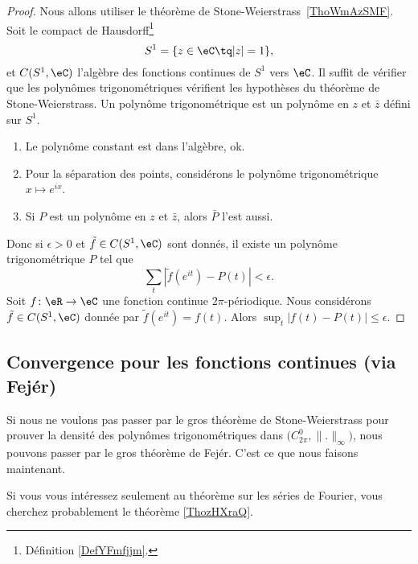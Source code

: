 \begin{proof}
	Nous allons utiliser le théorème de Stone-Weierstrass~\ref{ThoWmAzSMF}. Soit le compact de Hausdorff\footnote{Définition \ref{DefYFmfjjm}.}
	\begin{equation}
		S^1=\{ z\in \eC\tq | z |=1 \},
	\end{equation}
	et \( C(S^1,\eC)\) l'algèbre des fonctions continues de \( S^1\) vers \( \eC\). Il suffit de vérifier que les polynômes trigonométriques vérifient les hypothèses du théorème de Stone-Weierstrass. Un polynôme trigonométrique est un polynôme en \( z\) et \( \bar z\) défini sur \( S^1\).
	\begin{enumerate}
		\item
		      Le polynôme constant est dans l'algèbre, ok.
		\item
		      Pour la séparation des points, considérons le polynôme trigonométrique \( x\mapsto  e^{ix}\).
		\item
		      Si \( P\) est un polynôme en \( z\) et \( \bar z\), alors \( \bar P\) l'est aussi.
	\end{enumerate}
	Donc si \( \epsilon>0\) et \( \tilde f\in C(S^1,\eC)\) sont donnés, il existe un polynôme trigonométrique \( P\) tel que
	\begin{equation}
		\sum_t| \tilde f( e^{it})-P(t) |<\epsilon.
	\end{equation}
	Soit \( f\colon \eR\to \eC\) une fonction continue \( 2\pi\)-périodique. Nous considérons \( \tilde f\in C(S^1,\eC)\) donnée par \( \tilde f( e^{it})=f(t)\). Alors \( \sup_t| f(t)-P(t) |\leq \epsilon\).
\end{proof}

\subsection{Convergence pour les fonctions continues (via Fejér)}

Si nous ne voulons pas passer par le gros théorème de Stone-Weierstrass pour prouver la densité des polynômes trigonométriques dans \( \big( C^0_{2\pi},\| . \|_{\infty} \big)\), nous pouvons passer par le gros théorème de Fejér. C'est ce que nous faisons maintenant.

Si vous vous intéressez seulement au théorème sur les séries de Fourier, vous cherchez probablement le théorème \ref{ThozHXraQ}.

